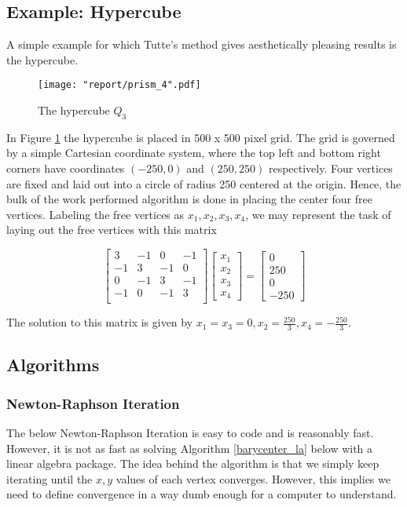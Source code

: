 \documentclass[11pt]{report}
\begin{document}
\subsection{Example: Hypercube}
A simple example for which Tutte's method gives aesthetically pleasing results is the hypercube.

\begin{figure}[H]\label{fig:hypercube}
    \centering
    \texttt{[image: "report/prism\_4".pdf]}
    \caption{The hypercube $Q_3$}
\end{figure}

In Figure \ref{fig:hypercube} the hypercube is placed in 500 x 500 pixel grid. The grid is governed by a simple Cartesian coordinate system, where the top left and bottom right corners have coordinates $(-250, 0)$ and $(250, 250)$ respectively. Four vertices are fixed and laid out into a circle of radius 250 centered at the origin. Hence, the bulk of the work performed algorithm is done in placing the center four free vertices. Labeling the free vertices as $x_1, x_2, x_3, x_4$, we may represent the task of laying out the free vertices with this matrix

\[
\begin{bmatrix}
    3 & -1 & 0 & -1 \\
    -1 & 3 & -1 & 0 \\
    0 & -1 & 3 & -1 \\
    -1 & 0 & -1 & 3 \\
\end{bmatrix}
\begin{bmatrix} x_1 \\ x_2 \\ x_3 \\ x_4 \end{bmatrix} =
\begin{bmatrix} 0 \\ 250 \\ 0 \\ -250 \end{bmatrix}
\]

The solution to this matrix is given by $x_1 = x_3 = 0, x_2 = \frac{250}{3}, x_4 = -\frac{250}{3}$.

\subsection{Algorithms}
\subsubsection{Newton-Raphson Iteration}
The below Newton-Raphson Iteration is easy to code and is reasonably fast. However, it is not as fast as solving Algorithm \ref{barycenter_la} below with a linear algebra package. The idea behind the algorithm is that we simply keep iterating until the $x, y$ values of each vertex converges. However, this implies we need to define convergence in a way dumb enough for a computer to understand.
\end{document}

